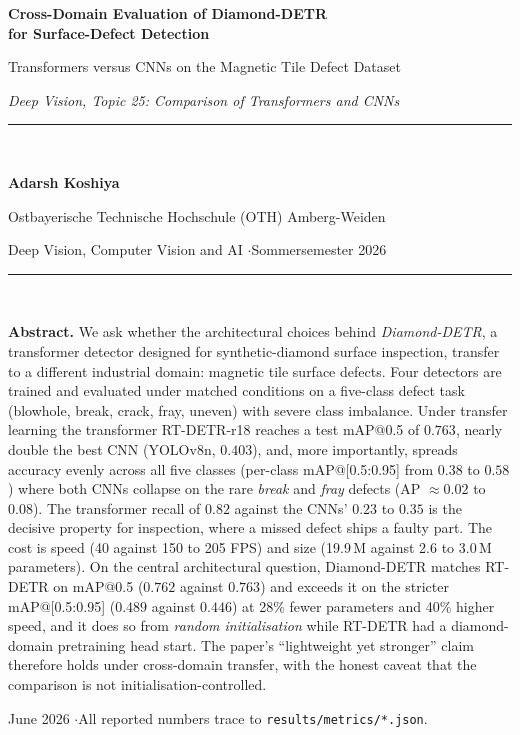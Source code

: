 \documentclass[11pt,a4paper]{article}
\begin{document}
\begin{titlepage}
\centering
\vspace*{1.2cm}
{\LARGE\bfseries\color{NavyBlue} Cross-Domain Evaluation of Diamond-DETR\\[0.3cm]
for Surface-Defect Detection\par}
\vspace{0.5cm}
{\large Transformers versus CNNs on the Magnetic Tile Defect Dataset\par}
\vspace{0.3cm}
{\large\itshape Deep Vision, Topic 25: Comparison of Transformers and CNNs\par}
\vspace{1.4cm}
\rule{0.7\textwidth}{0.5pt}\\[0.5cm]
{\large\bfseries Adarsh Koshiya\par}
\vspace{0.2cm}
{Ostbayerische Technische Hochschule (OTH) Amberg-Weiden\par}
{Deep Vision, Computer Vision and AI \quad$\cdot$\quad Sommersemester 2026\par}
\vspace{0.4cm}
\rule{0.7\textwidth}{0.5pt}\\[1.0cm]

\begin{minipage}{0.86\textwidth}\small
\textbf{Abstract.} We ask whether the architectural choices behind \emph{Diamond-DETR},
a transformer detector designed for synthetic-diamond surface inspection, transfer to a
different industrial domain: magnetic tile surface defects. Four detectors are trained and
evaluated under matched conditions on a five-class defect task (blowhole, break, crack, fray,
uneven) with severe class imbalance. Under transfer learning the transformer RT-DETR-r18 reaches
a test mAP@0.5 of $0.763$, nearly double the best CNN (YOLOv8n, $0.403$), and, more importantly,
spreads accuracy evenly across all five classes (per-class mAP@[0.5:0.95] from $0.38$ to $0.58$)
where both CNNs collapse on the rare \emph{break} and \emph{fray} defects (AP $\approx 0.02$ to
$0.08$). The transformer recall of $0.82$ against the CNNs' $0.23$ to $0.35$ is the decisive
property for inspection, where a missed defect ships a faulty part. The cost is speed (40 against
150 to 205 FPS) and size (19.9\,M against 2.6 to 3.0\,M parameters). On the central architectural
question, Diamond-DETR matches RT-DETR on mAP@0.5 ($0.762$ against $0.763$) and exceeds it on the
stricter mAP@[0.5:0.95] ($0.489$ against $0.446$) at 28\% fewer parameters and 40\% higher speed,
and it does so from \emph{random initialisation} while RT-DETR had a diamond-domain pretraining
head start. The paper's ``lightweight yet stronger'' claim therefore holds under cross-domain
transfer, with the honest caveat that the comparison is not initialisation-controlled.
\end{minipage}

\vfill
{\small June 2026 \quad$\cdot$\quad All reported numbers trace to \texttt{results/metrics/*.json}.}
\end{titlepage}
\end{document}
